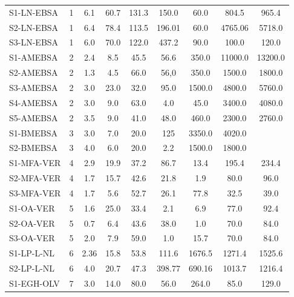 \begin{table}[h!]
{\begin{tabular}{l S S S S S S S S}
				S1-LN-EBSA   & 1 & 6.1   & 60.7   & 131.3  & 150.0    & 60.0     & 804.5     & 965.4    \\
				S2-LN-EBSA   & 1 & 6.4   & 78.4   & 113.5  & 196.01   & 60.0     & 4765.06   & 5718.0 \\
				S3-LN-EBSA   & 1 & 6.0   & 70.0   & 122.0  & 437.2    & 90.0     & 100.0     & 120.0      \\
				S1-AMEBSA    & 2 & 2.4   & 8.5    & 45.5   & 56.6     & 350.0    & 11000.0   & 13200.0    \\
				S2-AMEBSA    & 2 & 1.3   & 4.5    & 66.0   & 56,0     & 350.0    & 1500.0    & 1800.0     \\
				S3-AMEBSA    & 2 & 3.0   & 23.0   & 32.0   & 95.0     & 1500.0   & 4800.0    & 5760.0     \\
				S4-AMEBSA    & 2 & 3.0   & 9.0    & 63.0   & 4.0      & 45.0     & 3400.0    & 4080.0     \\
				S5-AMEBSA    & 2 & 3.5   & 9.0    & 41.0   & 48.0     & 460.0    & 2300.0    & 2760.0     \\
				S1-BMEBSA    & 3 & 3.0   & 7.0    & 20.0   & 125      & 3350.0   & 4020.0    &          \\
				S2-BMEBSA    & 3 & 4.0   & 6.0    & 20.0   & 2.2      & 1500.0   & 1800.0    &          \\
				S1-MFA-VER   & 4 & 2.9   & 19.9   & 37.2   & 86.7     & 13.4     & 195.4     & 234.4   \\
				S2-MFA-VER   & 4 & 1.7   & 15.7   & 42.6   & 21.8     & 1.9      & 80.0      & 96.0       \\
				S3-MFA-VER   & 4 & 1.7   & 5.6    & 52.7   & 26.1     & 77.8     & 32.5      & 39.0       \\
				S1-OA-VER    & 5 & 1.6   & 25.0   & 33.4   & 2.1      & 6.9      & 77.0      & 92.4     \\
				S2-OA-VER    & 5 & 0.7   & 6.4    & 43.6   & 38.0     & 1.0      & 70.0      & 84.0       \\
				S3-OA-VER    & 5 & 2.0   & 7.9    & 59.0   & 1.0      & 15.7     & 70.0      & 84.0       \\
				S1-LP-L-NL   & 6 & 2.36  & 15.8   & 53.8   & 111.6    & 1676.5   & 1271.4    & 1525.6  \\
				S2-LP-L-NL   & 6 & 4.0   & 20.7   & 47.3   & 398.77   & 690.16   & 1013.7    & 1216.4  \\
				S1-EGH-OLV   & 7 & 3.0   & 14.0   & 80.0   & 56.0     & 264.0    & 85.0      & 129.0      \\

\end{tabular}}
\end{table}
